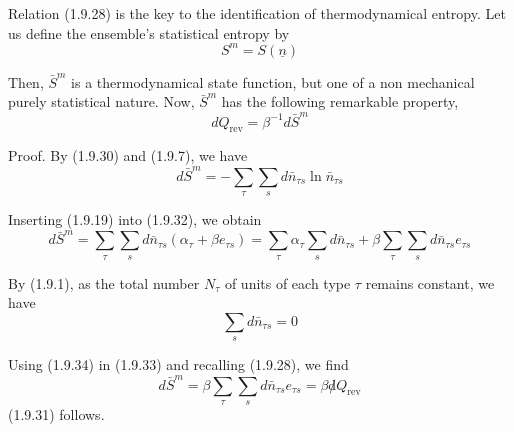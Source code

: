 \documentclass{article}
\begin{document}
Relation (1.9.28) is the key to the identification of thermodynamical entropy.
Let us define the ensemble's statistical entropy by
$$
\begin{equation*}
S^{m}=S(\underline{n}) \tag{1.9.30}
\end{equation*}
$$

Then, $\bar{S}^{m}$ is a thermodynamical state function, but one of a non mechanical purely statistical nature. Now, $\bar{S}^{m}$ has the following remarkable property,
$$
\begin{equation*}
d Q_{\mathrm{rev}}=\beta^{-1} d \bar{S}^{m} \tag{1.9.31}
\end{equation*}
$$

Proof. By (1.9.30) and (1.9.7), we have
$$
\begin{equation*}
d \bar{S}^{m}=-\sum_{\tau} \sum_{s} d \bar{n}_{\tau s} \ln \bar{n}_{\tau s} \tag{1.9.32}
\end{equation*}
$$

Inserting (1.9.19) into (1.9.32), we obtain
$$
\begin{equation*}
d \bar{S}^{m}=\sum_{\tau} \sum_{s} d \bar{n}_{\tau s}\left(\alpha_{\tau}+\beta e_{\tau s}\right)=\sum_{\tau} \alpha_{\tau} \sum_{s} d \bar{n}_{\tau s}+\beta \sum_{\tau} \sum_{s} d \bar{n}_{\tau s} e_{\tau s} \tag{1.9.33}
\end{equation*}
$$

By (1.9.1), as the total number $N_{\tau}$ of units of each type $\tau$ remains constant, we have
$$
\begin{equation*}
\sum_{s} d \bar{n}_{\tau s}=0 \tag{1.9.34}
\end{equation*}
$$

Using (1.9.34) in (1.9.33) and recalling (1.9.28), we find
$$
\begin{equation*}
d \bar{S}^{m}=\beta \sum_{\tau} \sum_{s} d \bar{n}_{\tau s} e_{\tau s}=\beta \not d Q_{\mathrm{rev}} \tag{1.9.35}
\end{equation*}
$$
(1.9.31) follows.
\end{document}
